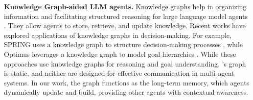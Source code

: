 \textbf{Knowledge Graph-aided LLM agents. }Knowledge graphs help in organizing information and facilitating structured reasoning for large language model agents \cite{ji2021survey, hogan2021knowledge, edge2024local}. They allow agents to store, retrieve, and update knowledge. %
Recent works have explored applications of knowledge graphs in decision-making. For example, SPRING uses a knowledge graph to structure decision-making processes \cite{wu2024spring}, while Optimus leverages a knowledge graph to model goal hierarchies \cite{li2024optimus}. %
While these approaches use knowledge graphs for reasoning and goal understanding, 
\cite{wu2024spring}'s graph is static,
and neither are designed for effective communication in multi-agent systems. %
In our work, the graph functions as the long-term memory, which agents dynamically update and build, providing other agents with contextual awareness. %



